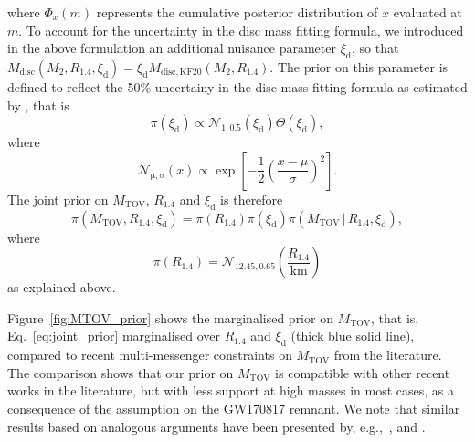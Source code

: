 \documentclass[]{aa}
\newcommand{\resp}[1]{#1}
\begin{document}
where $\Phi_x(m)$ represents the cumulative posterior distribution of $x$ \resp{evaluated at $m$}. \resp{To account for the uncertainty in the disc mass fitting formula, we introduced in the above formulation an additional nuisance parameter $\xi_\mathrm{d}$, so that $M_\mathrm{disc}(M_2,R_{1.4},\xi_\mathrm{d})=\xi_\mathrm{d}M_\mathrm{disc,KF20}(M_2,R_{1.4})$. The prior on this parameter is defined to reflect the 50\% uncertainy in the disc mass fitting formula as estimated by \citet{Kruger2020}, that is}
\begin{equation}
 \pi(\xi_\mathrm{d})\propto \mathcal{N}_\mathrm{1,0.5}(\xi_\mathrm{d})\Theta(\xi_\mathrm{d}),
\end{equation}
\resp{where}
\begin{equation}
\mathcal{N}_{\mathrm{\mu},\mathrm{\sigma}}(x)\propto \exp\left[-\frac{1}{2}\left(\frac{x - \mu}{\sigma}\right)^2\right].
\end{equation}
\resp{The joint prior on $M_\mathrm{TOV}$, $R_{1.4}$ and $\xi_\mathrm{d}$ is therefore}
\begin{equation}
 \pi(M_\mathrm{TOV},R_{1.4},\xi_\mathrm{d})=\pi(R_{1.4})\pi(\xi_\mathrm{d})\pi(M_\mathrm{TOV}\,|\,R_{1.4},\xi_\mathrm{d}),
 \label{eq:joint_prior}
\end{equation}
where
\begin{equation}
\pi(R_{1.4})=\mathcal{N}_\mathrm{12.45,0.65}\left(\frac{R_\mathrm{1.4}}{\mathrm{km}}\right)
\end{equation}
\resp{as explained above.}   

Figure~\ref{fig:MTOV_prior} shows the \resp{marginalised} prior \resp{on} $M_\mathrm{TOV}$, \resp{that is, Eq.~\ref{eq:joint_prior} marginalised over $R_{1.4}$ and $\xi_\mathrm{d}$} (thick blue solid line), compared to recent multi-messenger constraints on $M_\mathrm{TOV}$ from the literature. \resp{The comparison shows that our prior on $M_\mathrm{TOV}$ is compatible with other recent works in the literature, but with less support at high masses in most cases, as a consequence of the assumption on the GW170817 remnant. We note that similar results based on analogous arguments have been presented by, e.g.,\ \citet{Rezzolla2018}, \citet{Shibata2019} and \citet{Annala2022}.}
\end{document}
